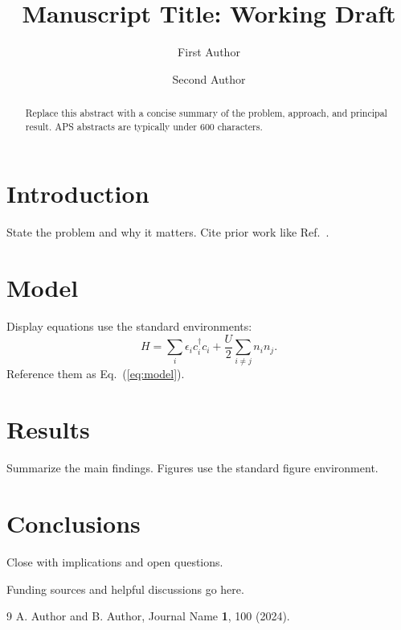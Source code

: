 \documentclass[aps,prl,twocolumn,superscriptaddress]{revtex4-2}
\begin{document}
\title{Manuscript Title: Working Draft}
\author{First Author}
\author{Second Author}

\begin{abstract}
Replace this abstract with a concise summary of the problem, approach, and
principal result. APS abstracts are typically under 600 characters.
\end{abstract}

\maketitle

\section{Introduction}
State the problem and why it matters. Cite prior work like
Ref.~\cite{example2024}.

\section{Model}
Display equations use the standard environments:
\begin{equation}
  H = \sum_{i} \epsilon_i c_i^\dagger c_i + \frac{U}{2} \sum_{i \ne j} n_i n_j.
  \label{eq:model}
\end{equation}
Reference them as Eq.~(\ref{eq:model}).

\section{Results}
Summarize the main findings. Figures use the standard figure environment.

\section{Conclusions}
Close with implications and open questions.

\begin{acknowledgments}
Funding sources and helpful discussions go here.
\end{acknowledgments}

\begin{thebibliography}{9}
 A. Author and B. Author, Journal Name \textbf{1}, 100 (2024).
\end{thebibliography}
\end{document}
